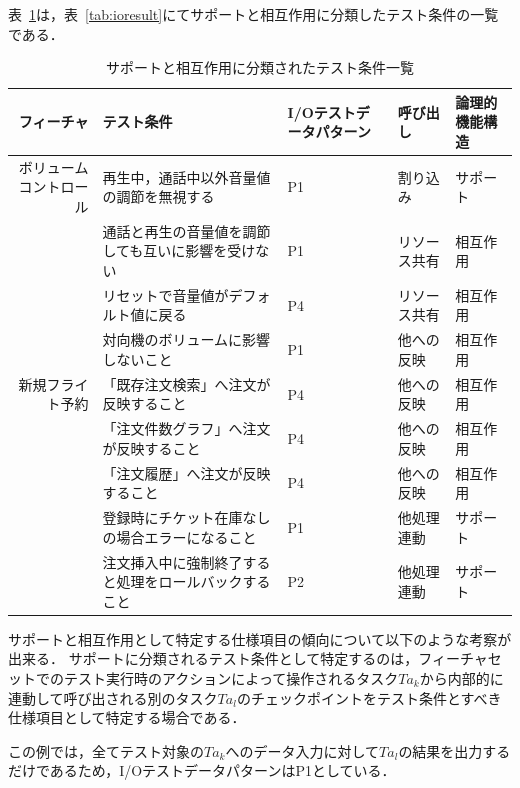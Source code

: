 表~\ref{tab:D-4-SandI}は，表~\ref{tab:ioresult}にてサポートと相互作用に分類したテスト条件の一覧である．

\begin{table}[htbp]
  \centering
  \caption{サポートと相互作用に分類されたテスト条件一覧}
    \begin{tabular}{|r|p{8em}|p{4em}|p{4em}|p{5em}|}
    \hline
    \multicolumn{1}{|p{5em}|}{フィーチャ} & テスト条件 & I/Oテストデータパターン & 呼び出し & 論理的機能構造 \bigstrut\\
    \hline
    \hline
    \multicolumn{1}{|p{4em}|}{ボリュームコントロール} & 再生中，通話中以外音量値の調節を無視する & P1　   & 割り込み  & サポート \bigstrut\\
\cline{2-5}          & 通話と再生の音量値を調節しても互いに影響を受けない & P1    & リソース共有 & 相互作用 \bigstrut\\
\cline{2-5}          & リセットで音量値がデフォルト値に戻る & P4　　  & リソース共有 & 相互作用 \bigstrut\\
    \cline{2-5}          & 対向機のボリュームに影響しないこと & P1　　  &  他への反映 & 相互作用 \bigstrut\\
    \hline
    \multicolumn{1}{|p{4em}|}{新規フライト予約} & 「既存注文検索」へ注文が反映すること & P4　   & 他への反映 & 相互作用 \bigstrut\\
\cline{2-5}          & 「注文件数グラフ」へ注文が反映すること & P4　   & 他への反映 & 相互作用 \bigstrut\\
\cline{2-5}          & 「注文履歴」へ注文が反映すること & P4    & 他への反映 & 相互作用 \bigstrut\\
\cline{2-5}          & 登録時にチケット在庫なしの場合エラーになること & P1    & 他処理連動 & サポート \bigstrut\\
\cline{2-5}          & 注文挿入中に強制終了すると処理をロールバックすること & P2    & 他処理連動 & サポート \bigstrut\\
    \hline
    \end{tabular}%
  \label{tab:D-4-SandI}%
\end{table}%

サポートと相互作用として特定する仕様項目の傾向について以下のような考察が出来る．
サポートに分類されるテスト条件として特定するのは，フィーチャセットでのテスト実行時のアクションによって操作されるタスク$Ta_k$から内部的に連動して呼び出される別のタスク$Ta_l$のチェックポイントをテスト条件とすべき仕様項目として特定する場合である．

この例では，全てテスト対象の$Ta_k$へのデータ入力に対して$Ta_l$の結果を出力するだけであるため，I/OテストデータパターンはP1としている．

